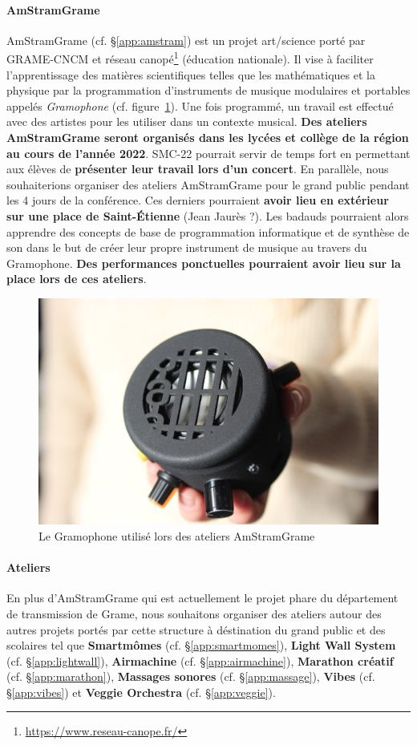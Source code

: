 \documentclass[fontsize=12pt]{scrartcl} %
\numberwithin{equation}{section} %
\numberwithin{table}{section} %
\begin{document}
\paragraph{\textbf{AmStramGrame}} AmStramGrame (cf. \S\ref{app:amstram}) est un projet art/science porté par GRAME-CNCM et réseau canopé\footnote{\url{https://www.reseau-canope.fr/}} (éducation nationale). Il vise à faciliter l'apprentissage des matières scientifiques telles que les mathématiques et la physique par la programmation d'instruments de musique modulaires et portables appelés \textit{Gramophone} (cf. figure~\ref{fig:gramo}). Une fois programmé, un travail est effectué avec des artistes pour les utiliser dans un contexte musical. \textbf{Des ateliers AmStramGrame seront organisés dans les lycées et collège de la région au cours de l'année 2022}. SMC-22 pourrait servir de temps fort en permettant aux élèves de \textbf{présenter leur travail lors d'un concert}. En parallèle, nous souhaiterions organiser des ateliers AmStramGrame pour le grand public pendant les 4 jours de la conférence. Ces derniers pourraient \textbf{avoir lieu en extérieur sur une place de Saint-Étienne} (Jean Jaurès ?). Les badauds pourraient alors apprendre des concepts de base de programmation informatique et de synthèse de son dans le but de créer leur propre instrument de musique au travers du Gramophone. \textbf{Des performances ponctuelles pourraient avoir lieu sur la place lors de ces ateliers}.  

\begin{figure}[h]
  \centering
  \includegraphics[width=12cm]{img/gramo}
  \caption{Le Gramophone utilisé lors des ateliers AmStramGrame}
  \label{fig:gramo}
\end{figure}

\paragraph{\textbf{Ateliers}} En plus d'AmStramGrame qui est actuellement le projet phare du département de transmission de Grame, nous souhaitons organiser des ateliers autour des autres projets portés par cette structure à déstination du grand public et des scolaires tel que \textbf{Smartmômes} (cf. \S\ref{app:smartmomes}), \textbf{Light Wall System} (cf. \S\ref{app:lightwall}), \textbf{Airmachine} (cf. \S\ref{app:airmachine}), \textbf{Marathon créatif} (cf. \S\ref{app:marathon}), \textbf{Massages sonores} (cf. 
\S\ref{app:massage}), \textbf{Vibes} (cf. \S\ref{app:vibes}) et \textbf{Veggie Orchestra} (cf. \S\ref{app:veggie}).
\end{document}
